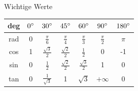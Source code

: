 \documentclass[a4paper,10pt]{article}
\begin{document}
				
				\begin{mainbox}{Wichtige Werte}
					\begin{center} 
						\begin{tabular}{c|cccccc}
							deg & $0 \degree $ & $30 \degree $        & $45 \degree $        & $60 \degree $        & $90 \degree $   & $180 \degree $ \\
							\hline
							rad & 0            & $\frac{\pi}{6}$      & $\frac{\pi}{4}$      & $\frac{\pi}{3}$      & $\frac{\pi}{2}$ & $\pi$          \\
							cos & 1            & $\frac{\sqrt{3}}{2}$ & $\frac{\sqrt{2}}{2}$ & $\frac{1}{2}$        & 0               & -1             \\
							sin & 0            & $\frac{1}{2}$        & $\frac{\sqrt{2}}{2}$ & $\frac{\sqrt{3}}{2}$ & 1               & 0              \\
							tan & 0            & $\frac{1}{\sqrt{3}}$ & 1                    & $\sqrt{3}$           & $+\infty$       & 0              \\
						\end{tabular}
					\end{center} 
				\end{mainbox}
				
\end{document}
